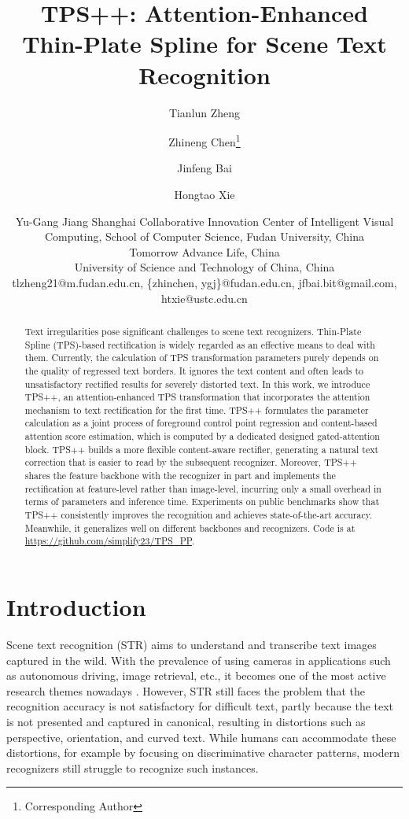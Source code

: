 \documentclass{article}
\title{TPS++: Attention-Enhanced Thin-Plate Spline for Scene Text Recognition}
\author{
Tianlun Zheng
\and
Zhineng Chen\footnote{Corresponding Author}\and
Jinfeng Bai\and
Hongtao Xie\and
Yu-Gang Jiang
\affiliations
Shanghai Collaborative Innovation Center of Intelligent Visual Computing, School of Computer Science, Fudan University, China\\
Tomorrow Advance Life, China\\
University of Science and Technology of China, China\\
\emails
tlzheng21@m.fudan.edu.cn,
\{zhinchen, ygj\}@fudan.edu.cn,
jfbai.bit@gmail.com,
htxie@ustc.edu.cn
}
\begin{document}
\maketitle

\begin{abstract}
Text irregularities pose significant challenges to scene text recognizers. Thin-Plate Spline (TPS)-based rectification is widely regarded as an effective means to deal with them. Currently, the calculation of TPS transformation parameters purely depends on the quality of regressed text borders. It ignores the text content and often leads to unsatisfactory rectified results for severely distorted text. In this work, we introduce TPS++, an attention-enhanced TPS transformation that incorporates the attention mechanism to text rectification for the first time. TPS++ formulates the parameter calculation as a joint process of foreground control point regression and content-based attention score estimation, which is computed by a dedicated designed gated-attention block. TPS++ builds a more flexible content-aware rectifier, generating a natural text correction that is easier to read by the subsequent recognizer. Moreover, TPS++ shares the feature backbone with the recognizer in part and implements the rectification at feature-level rather than image-level, incurring only a small overhead in terms of parameters and inference time. Experiments on public benchmarks show that TPS++ consistently improves the recognition and achieves state-of-the-art accuracy. Meanwhile, it generalizes well on different backbones and recognizers. Code is at \url{https://github.com/simplify23/TPS_PP}.

\end{abstract}

\section{Introduction}
Scene text recognition (STR) aims to understand and transcribe text images captured in the wild. With the prevalence of using cameras in applications such as autonomous driving, image retrieval, etc., it becomes one of the most active research themes nowadays \cite{Baekwhats_wrong_19ICCV,long2021str_era,Chen2021text,du2022@svtr,wang2022petr}. However, STR still faces the problem that the recognition accuracy is not satisfactory for difficult text, partly because the text is not presented and captured in canonical, resulting in distortions such as perspective, orientation, and curved text. While humans can accommodate these distortions, for example by focusing on discriminative character patterns, modern recognizers still struggle to recognize such instances. 
\end{document}
